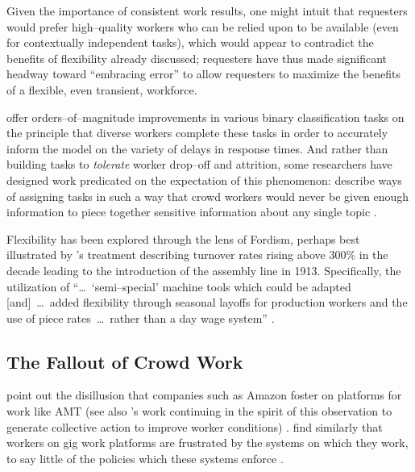 \documentclass[trackingWork]{subfiles}
\begin{document}
{Given the importance of consistent work results, one might intuit that
requesters would prefer high--quality workers who can be relied upon to be available
(even for contextually independent tasks),
which would appear to contradict the benefits of flexibility already discussed;
requesters have thus made significant headway toward
``embracing error'' to allow requesters to maximize the benefits of a flexible,
even transient,
workforce.

\citeauthor{embracingErrorKrishna} offer orders--of--magnitude improvements
in various binary classification tasks
on the principle that diverse workers complete these tasks
in order to accurately inform the model on the variety of delays in response times.
And rather than building tasks to \textit{tolerate} worker drop--off and attrition,
some researchers have designed work predicated on the expectation of this phenomenon:
\citeauthor{sensitiveTasks} describe ways of assigning tasks in such a way that
crowd workers would never be given enough information to piece together sensitive information about
any single topic
\cite{sensitiveTasks}.

Flexibility has been explored through the lens of Fordism, perhaps best illustrated by
\citeauthor{tolliday1986between}'s treatment describing
turnover rates rising above 300\% in the decade leading to the introduction of the assembly line in 1913.
Specifically, the utilization of ``\dots~`semi--special' machine tools which could be adapted
[and]~\dots~added flexibility through seasonal layoffs for production workers and the use of
piece rates~\dots~rather than a day wage system''
\cite{tolliday1986between}.







\subsection{The Fallout of Crowd Work}\label{sec:Fallout}
\citeauthor{turkopticon} point out the disillusion that companies such as Amazon foster on platforms for work like AMT
(see also \citeauthor{dynamo}'s work
continuing in the spirit of this observation to generate collective action to improve worker conditions)
\cite{turkopticon,dynamo}.
\citeauthor{uberAlgorithm}
find similarly that workers on gig work platforms are frustrated by the systems on which they work,
to say little of the policies which these systems enforce
\cite{uberAlgorithm}.

}
\end{document}
